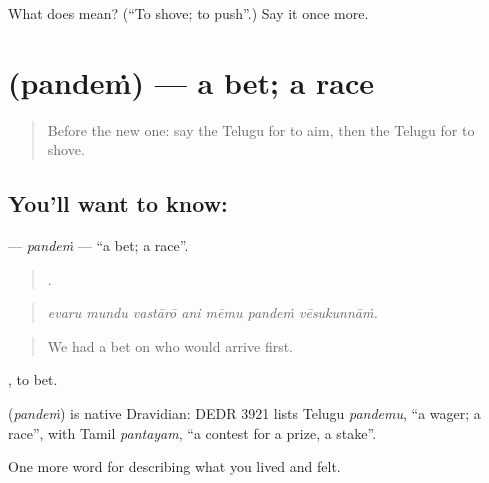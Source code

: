 \begin{tcolorbox}[breakable,colback=teal!4,colframe=teal!35!black,title={Before you move on}]
What does  mean? (\textquotedblleft{}To shove; to push\textquotedblright{}.) Say it once more.
\end{tcolorbox}
\section[\texorpdfstring{\te{పందెం} (pandeṁ)}{పందెం (pandeṁ)}]{ (pandeṁ) — a bet; a race}

\label{lesson:TE-C545-pandem}



\begin{quote}
Before the new one: say the Telugu for to aim, then the Telugu for to shove.
\end{quote}

\subsection*{You'll want to know: }
\textbf{} — \emph{pandeṁ} — \textquotedblleft{}a bet; a race\textquotedblright{}.

\begin{quote}
      .
\end{quote}

\begin{quote}
\emph{evaru mundu vastārō ani mēmu pandeṁ vēsukunnāṁ.}
\end{quote}

\begin{quote}
We had a bet on who would arrive first.
\end{quote}

 , to bet.

\begin{cousinweb}
\textbf{} (\emph{pandeṁ}) is native Dravidian: DEDR 3921 lists Telugu \emph{pandemu}, \textquotedblleft{}a wager; a race\textquotedblright{}, with Tamil \emph{pantayam}, \textquotedblleft{}a contest for a prize, a stake\textquotedblright{}.
\end{cousinweb}

\begin{grammarlens}[title={What you've built}]
One more word for describing what you lived and felt.
\end{grammarlens}

